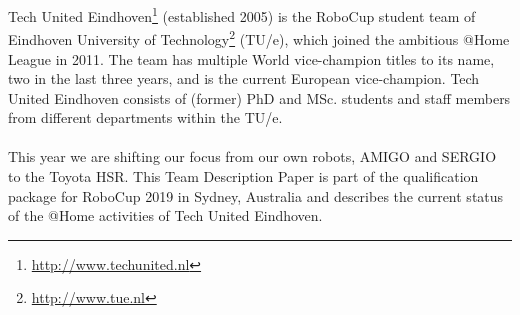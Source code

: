 Tech United Eindhoven\footnote{\url{http://www.techunited.nl}} (established 2005) is the RoboCup student team of Eindhoven University of Technology\footnote{\url{http://www.tue.nl}} (TU/e), which joined the ambitious @Home League in 2011. 
The team has multiple World vice-champion titles to its name, two in the last three years, and is the current European vice-champion. 
Tech United Eindhoven consists of (former) PhD and MSc. students and staff members from different departments within the TU/e.
\\
\\
This year we are shifting our focus from our own robots, AMIGO and SERGIO to the Toyota HSR.
This Team Description Paper is part of the qualification package for RoboCup 2019 in Sydney, Australia and describes the current status of the @Home activities of Tech United Eindhoven.
